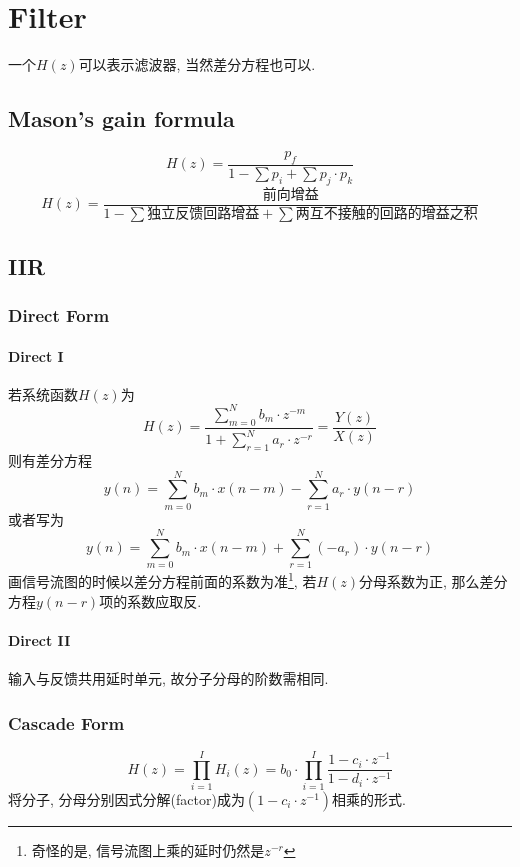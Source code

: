\documentclass[a4paper]{report}
\begin{document}
\chapter{Filter}
一个$H(z)$可以表示滤波器, 当然差分方程也可以. 
\section{Mason's gain formula}
\begin{equation}
  H(z)=\frac{p_f}{1-\sum p_i+\sum p_j\cdot p_k}
\end{equation}
\begin{equation}
  H(z)=\frac{\text{前向增益}}{1-\sum \text{独立反馈回路增益}+\sum \text{两互不接触的回路的增益之积}}
\end{equation}
\section{IIR}
\subsection{Direct Form}
\subsubsection{Direct I}
若系统函数$H(z)$为
\begin{equation}
  H(z)=\frac{\displaystyle\sum_{m=0}^{N}b_m\cdot z^{-m}}{1+\displaystyle\sum_{r=1}^{N}a_r\cdot z^{-r}}=\frac{Y(z)}{X(z)}
\end{equation}
则有差分方程
\begin{equation}
  y(n)=\displaystyle\sum_{m=0}^{N}b_m \cdot x(n-m)-\displaystyle\sum_{r=1}^{N}a_r\cdot y(n-r)
\end{equation}
或者写为
\begin{equation}
  y(n)=\displaystyle\sum_{m=0}^{N}b_m \cdot x(n-m)+\displaystyle\sum_{r=1}^{N}(-a_r)\cdot y(n-r)
\end{equation}
画信号流图的时候以差分方程前面的系数为准\footnote{奇怪的是, 信号流图上乘的延时仍然是$z^{-r}$}, 若$H(z)$分母系数为正, 那么差分方程$y(n-r)$项的系数应取反. 
\subsubsection{Direct II}
输入与反馈共用延时单元, 故分子分母的阶数需相同. 
\subsection{Cascade Form}
\begin{equation}
  H(z)=\displaystyle\prod_{i=1}^{I} H_i(z)=b_0\cdot\displaystyle\prod_{i=1}^{I}\frac{1-c_i\cdot z^{-1}}{1-d_i\cdot z^{-1}}
\end{equation}
将分子, 分母分别因式分解(factor)成为$(1-c_i\cdot z^{-1})$相乘的形式. 
\end{document}
